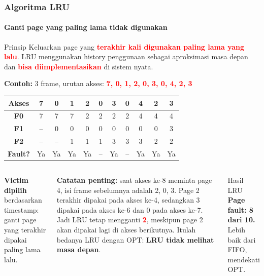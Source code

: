 \documentclass[t,aspectratio=169,xcolor=dvipsnames]{beamer}
\newcommand{\tem}[1]{\textbf{\textcolor{red}{#1}}}
\begin{document}
\begin{frame}
    \frametitle{Algoritma LRU}
    \framesubtitle{Ganti page yang paling lama tidak digunakan}
    \tiny

    \begin{block}{Prinsip}
        Keluarkan page yang \tem{terakhir kali digunakan paling lama yang lalu}. LRU menggunakan history penggunaan sebagai aproksimasi masa depan dan \tem{bisa diimplementasikan} di sistem nyata.
    \end{block}

    \vspace{0.1cm}
    \textbf{Contoh:} 3 frame, urutan akses: \tem{7, 0, 1, 2, 0, 3, 0, 4, 2, 3}

    \vspace{0.1cm}
    \begin{tabular}{|c|c|c|c|c|c|c|c|c|c|c|}
        \hline
        \textbf{Akses} & 7 & 0 & 1 & 2 & 0 & 3 & 0 & 4 & 2 & 3 \\
        \hline
        \textbf{F0} & \cellcolor{green!20}7 & 7 & 7 & \cellcolor{red!20}2 & 2 & 2 & 2 & \cellcolor{red!20}4 & 4 & 4 \\
        \hline
        \textbf{F1} & -- & \cellcolor{green!20}0 & 0 & 0 & 0 & 0 & 0 & 0 & 0 & \cellcolor{red!20}3 \\
        \hline
        \textbf{F2} & -- & -- & \cellcolor{green!20}1 & 1 & 1 & \cellcolor{red!20}3 & 3 & 3 & \cellcolor{red!20}2 & 2 \\
        \hline
        \textbf{Fault?} & \cellcolor{green!20}Ya & \cellcolor{green!20}Ya & \cellcolor{green!20}Ya & \cellcolor{red!20}Ya & -- & \cellcolor{red!20}Ya & -- & \cellcolor{red!20}Ya & \cellcolor{red!20}Ya & \cellcolor{red!20}Ya \\
        \hline
    \end{tabular}

    \vspace{0.1cm}
    \begin{columns}[T]
        \textbf{Victim dipilih} berdasarkan timestamp: ganti page yang terakhir dipakai paling lama lalu.

        \vspace{0.1cm}
        \textbf{Catatan penting:} saat akses ke-8 meminta page 4, isi frame sebelumnya adalah 2, 0, 3.
        Page 2 terakhir dipakai pada akses ke-4, sedangkan 3 dipakai pada akses ke-6 dan 0 pada akses ke-7.
        Jadi LRU tetap mengganti \tem{2}, meskipun page 2 akan dipakai lagi di akses berikutnya.
        Itulah bedanya LRU dengan OPT: \textbf{LRU tidak melihat masa depan}.

        \begin{alertblock}{Hasil LRU}
            \textbf{Page fault: 8 dari 10.}\\
            Lebih baik dari FIFO, mendekati OPT.
        \end{alertblock}
    \end{columns}
\end{frame}
\end{document}
